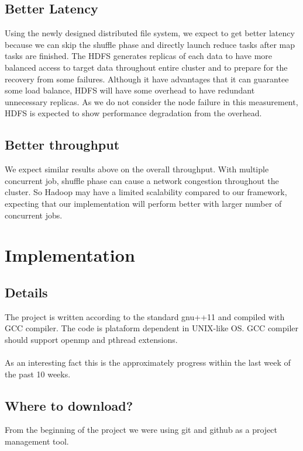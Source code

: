 \subsection*{Better Latency}
Using the newly designed distributed file system, we expect to get better latency because we
can skip the shuffle phase and directly launch reduce tasks after map tasks are finished. The
HDFS generates replicas of each data to have more balanced access to target data throughout
entire cluster and to prepare for the recovery from some failures. Although it have advantages
that it can guarantee some load balance, HDFS will have some overhead to have redundant unnecessary
replicas. As we do not consider the node failure in this measurement, HDFS is expected to show
performance degradation from the overhead.

\subsection*{Better throughput}
We expect similar results above on the overall throughput. With multiple concurrent job, shuffle
phase can cause a network congestion throughout the cluster. So Hadoop may have a limited scalability
compared to our framework, expecting that our implementation will perform better with larger
number of concurrent jobs.

\section*{Implementation}
\subsection*{Details}
The project is written according to the standard gnu++11 and compiled with GCC compiler.
The code is plataform dependent in UNIX-like OS. GCC compiler should support openmp and
pthread extensions. \\\\

As an interesting fact this is the approximately progress within the last week of the 
past 10 weeks.

\subsection*{Where to download?}
From the beginning of the project we were using git and github as a project management tool.

